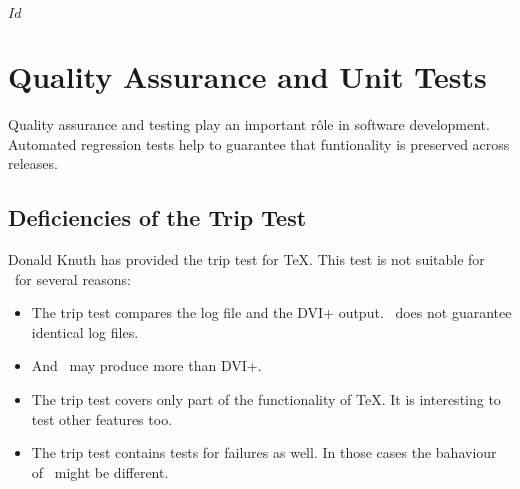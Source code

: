 \SVN$Id$
\chapter{Quality Assurance and Unit Tests}\label{chapter:testing}

Quality assurance and testing play an important r\^ole in software
development. Automated regression tests help to guarantee that
funtionality is preserved across releases.


\section{Deficiencies of the Trip Test}

Donald Knuth has provided the trip test for \TeX.
This test is not suitable for \ExTeX\ for several reasons:
\begin{itemize}
\item The trip test compares the log file and the \+DVI+ output.
  \ExTeX\ does not guarantee identical log files.
\item And \ExTeX\ may produce more than \+DVI+.
\item The trip test covers only part of the functionality of \TeX. It
  is interesting to test other features too.
\item The trip test contains tests for failures as well. In those
  cases the bahaviour of \ExTeX\ might be different.
\end{itemize}

